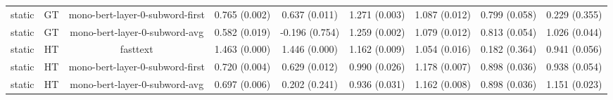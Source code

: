 \begin{sidewaystable}[htb]
\begin{tabular}{@{}ccccccccc@{}}
        static & GT & mono-bert-layer-0-subword-first & 0.765 (0.002) & 0.637 (0.011) & 1.271 (0.003) & 1.087 (0.012) & 0.799 (0.058) & 0.229 (0.355) \\
        static & GT & mono-bert-layer-0-subword-avg & 0.582 (0.019) & -0.196 (0.754) & 1.259 (0.002) & 1.079 (0.012) & 0.813 (0.054) & 1.026 (0.044) \\
        static & HT & fasttext & 1.463 (0.000) & 1.446 (0.000) & 1.162 (0.009) & 1.054 (0.016) & 0.182 (0.364) & 0.941 (0.056) \\
        static & HT & mono-bert-layer-0-subword-first & 0.720 (0.004) & 0.629 (0.012) & 0.990 (0.026) & 1.178 (0.007) & 0.898 (0.036) & 0.938 (0.054) \\
        static & HT & mono-bert-layer-0-subword-avg & 0.697 (0.006) & 0.202 (0.241) & 0.936 (0.031) & 1.162 (0.008) & 0.898 (0.036) & 1.151 (0.023) \\
        \bottomrule
    \end{tabular}
\end{sidewaystable}